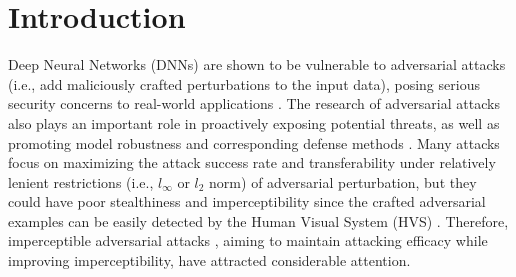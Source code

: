 \documentclass{article}
\begin{document}
\section{Introduction}
Deep Neural Networks (DNNs) are shown to be vulnerable to adversarial attacks \cite{42503,goodfellow2014explaining} (i.e., add maliciously crafted perturbations to the input data), posing serious security concerns to real-world applications \cite{yuan2019adversarial}.
The research of adversarial attacks also plays an important role in proactively exposing potential threats, as well as promoting model robustness and corresponding defense methods \cite{naseer2020self, lee2023robust, singh2024revisiting, luo2023beyond, tramèr2018ensemble, salman2020adversarially, luo2021capsule, cohen2019certified}.
Many attacks \cite{madry2018towards,dong2018boosting,zhang2022enhancing,wei2023enhancing} focus on maximizing the attack success rate and transferability under relatively lenient restrictions (i.e., $l_{\infty}$ or $l_{2}$ norm) of adversarial perturbation, but they could have poor stealthiness and imperceptibility since the crafted adversarial examples can be easily detected by the Human Visual System (HVS) \cite{sharif2018suitability}.
Therefore, imperceptible adversarial attacks 
\cite{carlini2017towards,luo2018towards,zhao2020towards,laidlaw2021perceptual,duan2021advdrop,chen2023imperceptible,jia2022exploring}, 
aiming to maintain attacking efficacy while improving imperceptibility, have attracted considerable attention.  
\end{document}
